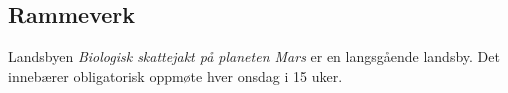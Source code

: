 \subsection{Rammeverk}

Landsbyen \textit{Biologisk skattejakt på planeten Mars} er en langsgående landsby.
Det innebærer obligatorisk oppmøte hver onsdag i 15 uker. 